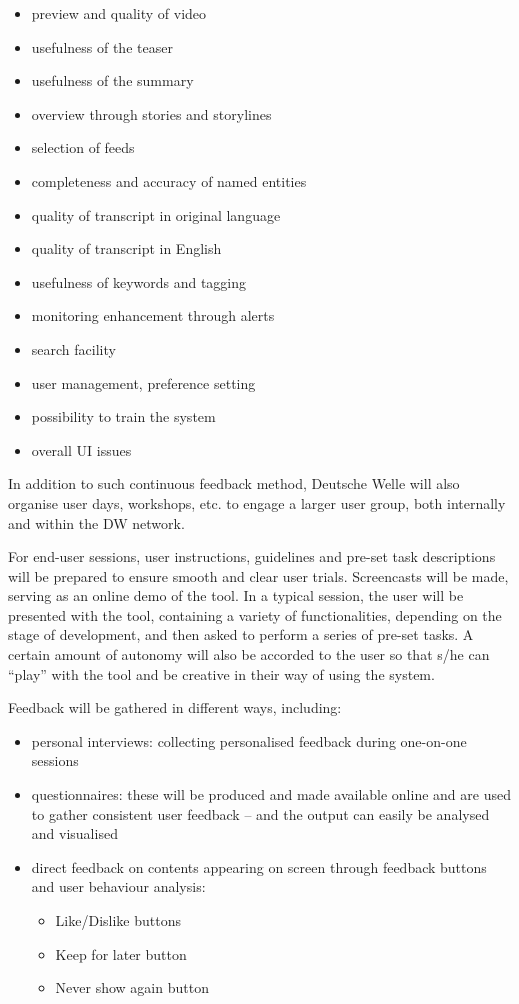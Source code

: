\begin{itemize}
\item preview and quality of video
\item usefulness of the teaser
\item usefulness of the summary
\item overview through stories and storylines
\item selection of feeds
\item completeness and accuracy of named entities
\item quality of transcript in original language
\item quality of transcript in English
\item usefulness of keywords and tagging
\item monitoring enhancement through alerts
\item search facility
\item user management, preference setting
\item possibility to train the system
\item overall UI issues
\end{itemize}

In addition to such continuous feedback method, Deutsche Welle will also organise user days, workshops, etc. to engage a larger user group, both internally and within the DW network. 

For end-user sessions, user instructions, guidelines and pre-set task descriptions will be prepared to ensure smooth and clear user trials. Screencasts will be made, serving as an online demo of the tool. In a typical session, the user will be presented with the \SUMMA tool, containing a variety of functionalities, depending on the stage of development, and then asked to perform a series of pre-set tasks. A certain amount of autonomy will also be accorded to the user so that s/he can “play” with the tool and be creative in their way of using the system.

Feedback will be gathered in different ways, including:
\begin{itemize}
\item personal interviews: collecting personalised feedback during one-on-one sessions
\item questionnaires: these will be produced and made available online and are used to gather consistent user feedback – and the output can easily be analysed and visualised 
\item direct feedback on contents appearing on screen through feedback buttons and user behaviour analysis:
\begin{itemize}
\item Like/Dislike buttons
\item Keep for later button
\item Never show again button 
\end{itemize}
\end{itemize}

